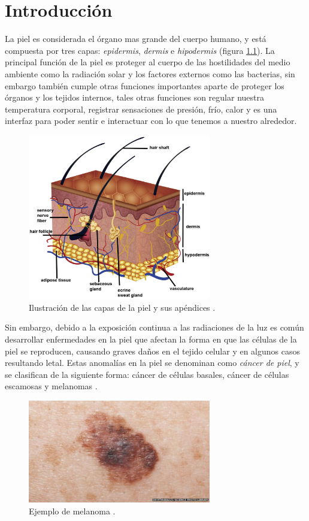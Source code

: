 
\chapter{Introducción}

La piel es considerada el órgano mas grande del cuerpo humano,  y está compuesta por tres capas: \emph{\gls{epidermis}}, \emph{\gls{dermis}} e \emph{\gls{hipodermis}} (figura \ref{fig:skin1_jpg}). La principal función de la piel es proteger al cuerpo de las hostilidades del medio ambiente como la radiación solar y los factores externos como las bacterias, sin embargo también cumple otras funciones importantes aparte de proteger los órganos y los tejidos internos, tales otras funciones son regular nuestra temperatura corporal, registrar sensaciones de presión, frío, calor y es una interfaz para poder sentir e interactuar con lo que tenemos a nuestro alrededor.

\begin{figure}[h!]
    \includegraphics[width=80mm, scale = 0.5]{Figuras/skin_structure1.jpg}
    \centering
    \caption{Ilustración de las capas de la piel y sus apéndices \citep{skin_1}.}
    \label{fig:skin1_jpg}
\end{figure}


Sin embargo, debido a la exposición continua a las radiaciones de la luz es común desarrollar enfermedades en la piel que afectan la forma en que las células de la piel se reproducen, causando graves daños en el tejido celular y en algunos casos resultando letal. Estas anomalías en la piel se denominan como \emph{cáncer de piel}, y se clasifican de la siguiente forma: cáncer de células basales, cáncer de células escamosas y melanomas \citep{cancer_org}.

\begin{figure}[h!]
    \includegraphics[width=80mm]{Figuras/skin_cancer_bbc.jpg}
    \centering
    \caption{Ejemplo de melanoma \citep{cancer_img_1}.}
    \label{fig:can_jpg}
\end{figure}

